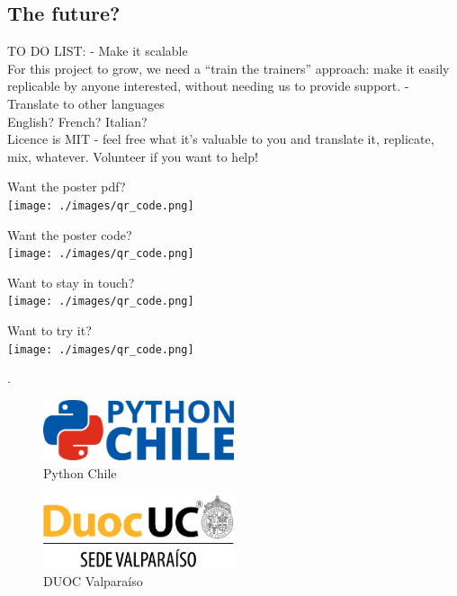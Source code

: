 \documentclass[
  letterpaper,
  DIV=11,
  numbers=noendperiod]{scrartcl}
\begin{document}
\subsection{The future?}\label{the-future}

TO DO LIST: - Make it scalable\\
For this project to grow, we need a ``train the trainers'' approach:
make it easily replicable by anyone interested, without needing us to
provide support. - Translate to other languages\\
English? French? Italian?\\
Licence is MIT - feel free what it's valuable to you and translate it,
replicate, mix, whatever. Volunteer if you want to help!

Want the poster pdf?\\
\texttt{[image: ./images/qr\_code.png]}

Want the poster code?\\
\texttt{[image: ./images/qr\_code.png]}

Want to stay in touch?\\
\texttt{[image: ./images/qr\_code.png]}

Want to try it?\\
\texttt{[image: ./images/qr\_code.png]}

.

\begin{figure}[H]

{\centering \includegraphics[width=0.5\textwidth,height=\textheight]{./images/pythonchile.png}

}

\caption{Python Chile}

\end{figure}%

\begin{figure}[H]

{\centering \includegraphics[width=0.5\textwidth,height=\textheight]{./images/duoc_valparaiso.png}

}

\caption{DUOC Valparaíso}

\end{figure}%
\end{document}
